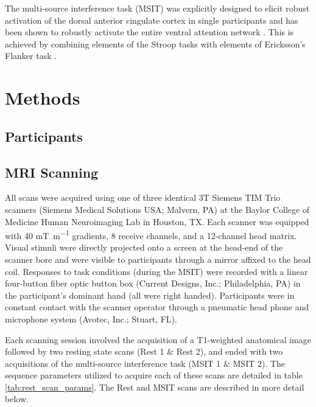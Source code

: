 \documentclass[english,11pt]{article}
\begin{document}
The multi-source interference task (MSIT) was explicitly designed to elicit robust activation of the dorsal anterior cingulate cortex in single participants\cite{Bush2006} and has been shown to robustly activate the entire ventral attention network \cite{needed}. This is achieved by combining elements of the Stroop tasks\cite{needed} with elements of Ericksson's Flanker task \cite{needed}. 



\section*{Methods }




\subsection*{Participants}

\subsection*{MRI Scanning}

All scans were acquired using one of three identical 3T Siemens TIM Trio scanners (Siemens Medical Solutions USA; Malvern, PA) at the Baylor College of Medicine Human Neuroimaging Lab in Houston, TX. Each scanner was equipped with 40 \si{\milli\tesla\per\meter} gradients, 8 receive channels, and a 12-channel head matrix. Visual stimuli were directly projected onto a screen at the head-end of the scanner bore and were visible to participants through a mirror affixed to the head coil. Responses to task conditions (during the MSIT) were recorded with a linear four-button fiber optic button box (Current Designs, Inc.; Philadelphia, PA) in the participant's dominant hand (all were right handed). Participants were in constant contact with the scanner operator through a pneumatic head phone and microphone system (Avotec, Inc.; Stuart, FL). 

Each scanning session involved the acquisition of a T1-weighted anatomical image followed by two resting state scans (Rest 1 \& Rest 2), and ended with two acquisitions of the multi-source interference task (MSIT 1 \& MSIT 2). The sequence parameters utilized to acquire each of these scans are detailed in table \ref{tab:rest_scan_params}. The Rest and MSIT scans are described in more detail below.
\end{document}

